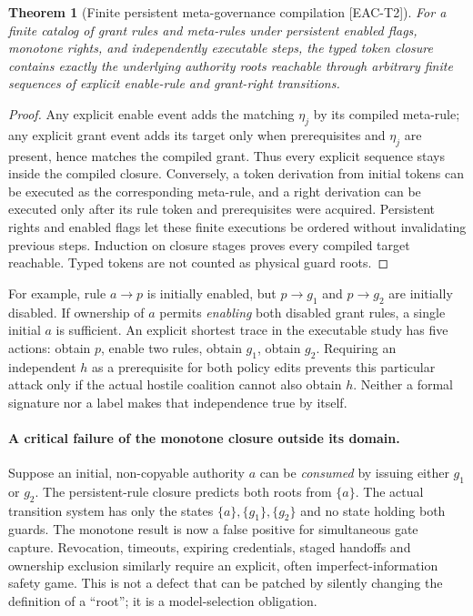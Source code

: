 \documentclass[11pt,a4paper]{article}
\newtheorem{theorem}{Theorem}
\theoremstyle{definition}\newtheorem{definition}{Definition}
\newcommand{\idtag}[1]{\textnormal{\textsf{[#1]}}}
\begin{document}
\begin{theorem}[Finite persistent meta-governance compilation \idtag{EAC-T2}]
For a finite catalog of grant rules and meta-rules under persistent enabled flags, monotone rights, and independently executable steps, the typed token closure contains exactly the underlying authority roots reachable through arbitrary finite sequences of explicit \emph{enable-rule} and \emph{grant-right} transitions.
\end{theorem}
\begin{proof}
Any explicit enable event adds the matching $\eta_j$ by its compiled meta-rule; any explicit grant event adds its target only when prerequisites and $\eta_j$ are present, hence matches the compiled grant. Thus every explicit sequence stays inside the compiled closure. Conversely, a token derivation from initial tokens can be executed as the corresponding meta-rule, and a right derivation can be executed only after its rule token and prerequisites were acquired. Persistent rights and enabled flags let these finite executions be ordered without invalidating previous steps. Induction on closure stages proves every compiled target reachable. Typed tokens are not counted as physical guard roots.
\end{proof}
For example, rule $a\rightarrow p$ is initially enabled, but $p\rightarrow g_1$ and $p\rightarrow g_2$ are initially disabled. If ownership of $a$ permits \emph{enabling} both disabled grant rules, a single initial $a$ is sufficient. An explicit shortest trace in the executable study has five actions: obtain $p$, enable two rules, obtain $g_1$, obtain $g_2$. Requiring an independent $h$ as a prerequisite for both policy edits prevents this particular attack only if the actual hostile coalition cannot also obtain $h$. Neither a formal signature nor a label makes that independence true by itself.

\paragraph{A critical failure of the monotone closure outside its domain.}
Suppose an initial, non-copyable authority $a$ can be \emph{consumed} by issuing either $g_1$ or $g_2$. The persistent-rule closure predicts both roots from $\{a\}$. The actual transition system has only the states $\{a\},\{g_1\},\{g_2\}$ and no state holding both guards. The monotone result is now a false positive for simultaneous gate capture. Revocation, timeouts, expiring credentials, staged handoffs and ownership exclusion similarly require an explicit, often imperfect-information safety game. This is not a defect that can be patched by silently changing the definition of a ``root''; it is a model-selection obligation.
\end{document}
